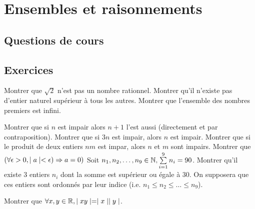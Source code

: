  \chapter{Ensembles et raisonnements}



\section{Questions de cours}	




\section{Exercices}


\begin{exercise}[subtitle= Absurde, difficulty=*]
	\begin{tasks} 
		\task 	Montrer que $\sqrt{2}$  n'est pas un nombre rationnel.
		\task Montrer qu'il n'existe pas d'entier naturel supérieur à tous les autres. 
		\task Montrer que l'ensemble des nombres premiers est infini.   
	\end{tasks}
\end{exercise}

\begin{exercise}[subtitle= Contraposition, difficulty=*]
		\begin{tasks} 
			\task Montrer que si $n$ est impair alors $n+1$ l'est aussi (directement et par contraposition).
			\task Montrer que si $3n$ est impair, alors $n$ est impair.  
			\task Montrer que si le produit de deux entiers $nm$ est impar, alors $n$ et $m$ sont impairs. 
			\task Montrer que $(\forall \epsilon > 0, \mid a \mid < \epsilon) \Rightarrow a=0 )$
			\task Soit $n_1, n_2, \dots, n_9 \in \mathbb{N}, \sum\limits_{i=1}^9 n_i =90$. Montrer qu'il existe 3 entiers $n_i$ dont la somme est supérieur ou égale à 30. On supposera que ces entiers sont ordonnés par leur indice (i.e. $n_1 \le n_2 \le \dots \le n_9$). 
		\end{tasks}
\end{exercise}



\begin{exercise}[subtitle= Disjonction des cas, difficulty=*]
	\begin{tasks} 
		\task Montrer que $\forall x,y \in \mathbb{R},  \mid xy \mid =\mid x \mid\mid y \mid$.
		\task   
	\end{tasks}
\end{exercise}
